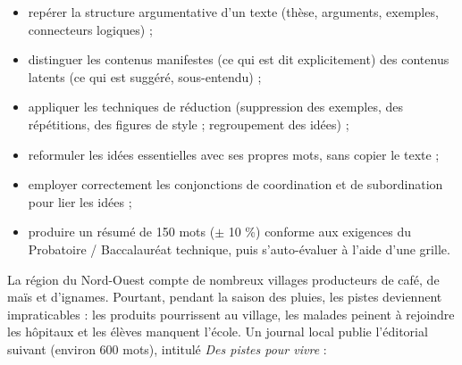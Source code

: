 \documentclass[11pt]{article}
\newcommand{\cle}[1]{{\popxbold\color{popdark}#1}}
\newcounter{popsec}
\newcounter{popsub}
\newcommand{\courssub}[1]{%
  \stepcounter{popsub}%
  \par\vspace{9pt}\noindent{\popxbold\fontsize{11.5}{13}\selectfont\color{popink}{\color{poporange}\thepopsec.\thepopsub}\hspace{6pt}#1}\par\nopagebreak\vspace{4pt}
}
\begin{document}
\begin{itemize}
\item repérer la \cle{structure argumentative} d'un texte (thèse, arguments, exemples, connecteurs logiques) ;
\item distinguer les \cle{contenus manifestes} (ce qui est dit explicitement) des \cle{contenus latents} (ce qui est suggéré, sous-entendu) ;
\item appliquer les \cle{techniques de réduction} (suppression des exemples, des répétitions, des figures de style ; regroupement des idées) ;
\item \cle{reformuler} les idées essentielles avec ses propres mots, sans copier le texte ;
\item employer correctement les \cle{conjonctions de coordination et de subordination} pour lier les idées ;
\item produire un \cle{résumé} de 150 mots ($\pm$ 10 \%) conforme aux exigences du Probatoire / Baccalauréat technique, puis s'auto-évaluer à l'aide d'une grille.
\end{itemize}

\courssub{Situation}

La région du Nord-Ouest compte de nombreux villages producteurs de café, de maïs et d'ignames. Pourtant, pendant la saison des pluies, les pistes deviennent impraticables : les produits pourrissent au village, les malades peinent à rejoindre les hôpitaux et les élèves manquent l'école. Un journal local publie l'éditorial suivant (environ 600 mots), intitulé \emph{Des pistes pour vivre} :
\end{document}
